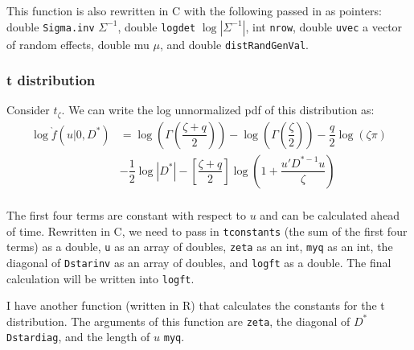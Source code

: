 \documentclass{article}
\begin{document}
This function is also rewritten in C with the following  passed in as pointers: double \texttt{Sigma.inv} $\Sigma^{-1}$, double \texttt{logdet} $\log |\Sigma^{-1}|$, int \texttt{nrow}, double \texttt{uvec} a vector of random effects, double {mu} $\mu$, and double \texttt{distRandGenVal}.







\subsubsection{t distribution}\label{sec:tstuff}

Consider $t_\zeta$. We can write the log unnormalized pdf of this distribution as:
\begin{align}
\log \grave{f}(u|0,D^*)&=  \log \left( \Gamma \left( \dfrac{\zeta+q}{2}  \right)   \right)-\log \left( \Gamma \left( \dfrac{\zeta}{2}  \right)   \right)  - \dfrac{q}{2} \log(\zeta \pi)\\
&- \dfrac{1}{2} \log |D^*|     -\left[ \dfrac{\zeta+q}{2} \right] \log \left(1+\dfrac{u'D^{* -1}u}{\zeta} \right)\\
\end{align}

The first four terms are constant with respect to $u$ and can be calculated ahead of time. Rewritten in C, we need to pass in  \texttt{tconstants} (the sum of the first four terms) as a double, \texttt{u} as an array of doubles, \texttt{zeta} as an int, \texttt{myq} as an int, the diagonal of \texttt{Dstarinv} as an array of doubles,  and \texttt{logft} as a double. The final calculation will be written into \texttt{logft}.

I have another function (written in R) that calculates the constants for the t distribution. The arguments of this function are \texttt{zeta}, the diagonal of $D^*$ \texttt{Dstardiag}, and the length of $u$ \texttt{myq}.
\end{document}
